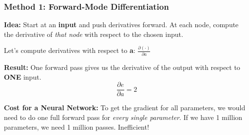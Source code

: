 \documentclass[xcolor=svgnames, 10pt, handout]{beamer}
\begin{document}
\begin{frame}
\frametitle{Method 1: Forward-Mode Differentiation}

\textbf{Idea:} Start at an \textbf{input} and push derivatives forward. At each node, compute the derivative of \textit{that node} with respect to the chosen input.

Let's compute derivatives with respect to \textbf{a}: $\frac{\partial(\cdot)}{\partial a}$

\begin{center}
\end{center}

\textbf{Result:} One forward pass gives us the derivative of the output with respect to \textbf{ONE} input.
\begin{equation*}
    \frac{\partial e}{\partial a} = 2
\end{equation*}

\textbf{Cost for a Neural Network:}
To get the gradient for all parameters, we would need to do one full forward pass for \textit{every single parameter}. If we have 1 million parameters, we need 1 million passes. Inefficient!

\end{frame}
\end{document}
